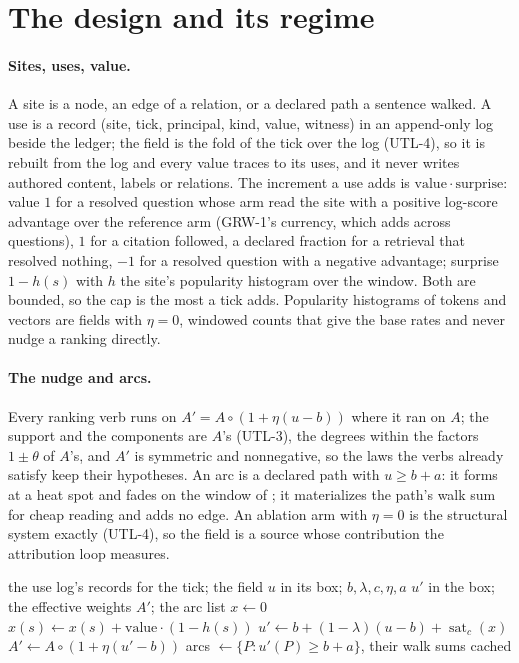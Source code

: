 \documentclass[11pt,a4paper]{article}
\theoremstyle{plain}
\theoremstyle{definition}
\DeclareMathOperator{\sat}{sat}
\begin{document}
\section{The design and its regime}\label{sec:regime}

\paragraph{Sites, uses, value.}
A site is a node, an edge of a relation, or a declared path a sentence walked. A use is a record
(site, tick, principal, kind, value, witness) in an append-only log beside the ledger; the field is
the fold of the tick over the log (UTL-4), so it is rebuilt from the log and every value traces to
its uses, and it never writes authored content, labels or relations. The increment a use adds is
$\mathrm{value}\cdot\mathrm{surprise}$: value $1$ for a resolved question whose arm read the site with
a positive log-score advantage over the reference arm (GRW-1's currency, which adds across
questions), $1$ for a citation followed, a declared fraction for a retrieval that resolved
nothing, $-1$ for a resolved question with a negative advantage; surprise $1 - h(s)$ with $h$ the
site's popularity histogram over the window. Both are bounded, so the cap is the most a tick adds.
Popularity histograms of tokens and vectors are fields with $\eta = 0$, windowed counts that give the
base rates and never nudge a ranking directly.

\paragraph{The nudge and arcs.}
Every ranking verb runs on $A' = A \circ (1 + \eta(u - b))$ where it ran on $A$; the support and
the components are $A$'s (UTL-3), the degrees within the factors $1 \pm \theta$ of $A$'s, and $A'$
is symmetric and nonnegative, so the laws the verbs already satisfy keep their hypotheses. An arc is a declared path with $u \ge b + a$: it forms at a heat spot and fades on the
window of ; it materializes the path's walk sum for cheap reading and adds no edge.
An ablation arm with $\eta = 0$ is the structural system exactly (UTL-4), so the field is a source
whose contribution the attribution loop measures.

\begin{algorithm}[ht]
\caption{One tick of the field.}
\begin{algorithmic}[1]
\Require the use log's records for the tick; the field $u$ in its box; $b, \lambda, c, \eta, a$
\Ensure $u'$ in the box; the effective weights $A'$; the arc list
\State $x \gets 0$
  \State $x(s) \gets x(s) + \mathrm{value}\cdot(1 - h(s))$ 
\EndFor
\State $u' \gets b + (1-\lambda)(u - b) + \sat_c(x)$ 
\State $A' \gets A \circ (1 + \eta(u' - b))$ 
\State arcs $\gets \{P : u'(P) \ge b + a\}$, their walk sums cached
\end{algorithmic}
\end{algorithm}
\end{document}
